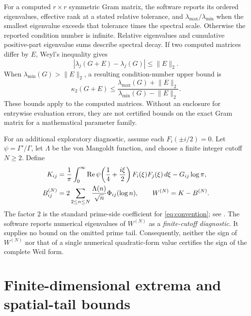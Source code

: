 \documentclass[11pt]{article}
\begin{document}
For a computed $r\times r$ symmetric Gram matrix, the software reports
its ordered eigenvalues, effective rank at a stated relative tolerance,
and $\lambda_{\max}/\lambda_{\min}$ when the smallest eigenvalue exceeds
that tolerance times the spectral scale. Otherwise the reported
condition number is infinite. Relative eigenvalues and cumulative
positive-part eigenvalue sums describe spectral decay. If two computed
matrices differ by $E$, Weyl's inequality gives
\begin{equation}\label{eq:weyl}
 |\lambda_j(G+E)-\lambda_j(G)|\leq\lVert E\rVert_2.
\end{equation}
When $\lambda_{\min}(G)>\lVert E\rVert_2$, a resulting condition-number
upper bound is
\begin{equation}\label{eq:condition-bound}
 \kappa_2(G+E)\leq
 \frac{\lambda_{\max}(G)+\lVert E\rVert_2}
      {\lambda_{\min}(G)-\lVert E\rVert_2}.
\end{equation}
These bounds apply to the computed matrices. Without an enclosure for
entrywise evaluation errors, they are not certified bounds on the exact
Gram matrix for a mathematical parameter family.

For an additional exploratory diagnostic, assume each
$F_i(\pm i/2)=0$. Let $\psi=\Gamma'/\Gamma$,
let $\Lambda$ be the von Mangoldt function, and choose a finite
integer cutoff $N\geq2$. Define
\begin{align}\label{eq:finite-weil}
 K_{ij}
 &=\frac1\pi\int_0^\infty
   \operatorname{Re}\psi\!\left(\frac14+\frac{i\xi}{2}\right)
   F_i(\xi)F_j(\xi)\,d\xi-G_{ij}\log\pi,\\
 B^{(N)}_{ij}
 &=2\sum_{2\leq n\leq N}
   \frac{\Lambda(n)}{\sqrt n}\Phi_{ij}(\log n),
 \qquad W^{(N)}=K-B^{(N)}.\notag
\end{align}
The factor $2$ is the standard prime-side coefficient for
\eqref{eq:convention}; see \cite{conrey}. The software reports
numerical eigenvalues of $W^{(N)}$ as a \emph{finite-cutoff diagnostic}.
It supplies no bound on the omitted prime tail. Consequently,
neither the sign of $W^{(N)}$ nor that of a single numerical
quadratic-form value certifies the sign of the complete Weil form.

\section{Finite-dimensional extrema and spatial-tail bounds}
\end{document}
